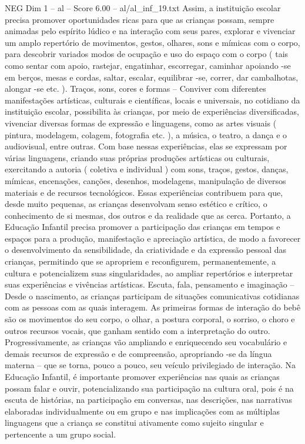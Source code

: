 \begin{textsample}{NEG Dim 1 – al – Score 6.00 – al/al\_inf\_19.txt}
Assim, a instituição escolar precisa promover oportunidades ricas para que as crianças possam, sempre animadas pelo espírito lúdico e na interação com seus pares, explorar e vivenciar um amplo repertório de movimentos, gestos, olhares, sons e mímicas com o corpo, para descobrir variados modos de ocupação e uso do espaço com o corpo ( tais como sentar com apoio, rastejar, engatinhar, escorregar, caminhar apoiando -se em berços, mesas e cordas, saltar, escalar, equilibrar -se, correr, dar cambalhotas, alongar -se etc. ).
Traços, sons, cores e formas – Conviver com diferentes manifestações artísticas, culturais e científicas, locais e universais, no cotidiano da instituição escolar, possibilita às crianças, por meio de experiências diversificadas, vivenciar diversas formas de expressão e linguagens, como as artes visuais ( pintura, modelagem, colagem, fotografia etc. ), a música, o teatro, a dança e o audiovisual, entre outras.
Com base nessas experiências, elas se expressam por várias linguagens, criando suas próprias produções artísticas ou culturais, exercitando a autoria ( coletiva e individual ) com sons, traços, gestos, danças, mímicas, encenações, canções, desenhos, modelagens, manipulação de diversos materiais e de recursos tecnológicos.
Essas experiências contribuem para que, desde muito pequenas, as crianças desenvolvam senso estético e crítico, o conhecimento de si mesmas, dos outros e da realidade que as cerca.
Portanto, a Educação Infantil precisa promover a participação das crianças em tempos e espaços para a produção, manifestação e apreciação artística, de modo a favorecer o desenvolvimento da sensibilidade, da criatividade e da expressão pessoal das crianças, permitindo que se apropriem e reconfigurem, permanentemente, a cultura e potencializem suas singularidades, ao ampliar repertórios e interpretar suas experiências e vivências artísticas.
Escuta, fala, pensamento e imaginação – Desde o nascimento, as crianças participam de situações comunicativas cotidianas com as pessoas com as quais interagem.
As primeiras formas de interação do bebê são os movimentos do seu corpo, o olhar, a postura corporal, o sorriso, o choro e outros recursos vocais, que ganham sentido com a interpretação do outro.
Progressivamente, as crianças vão ampliando e enriquecendo seu vocabulário e demais recursos de expressão e de compreensão, apropriando -se da língua materna – que se torna, pouco a pouco, seu veículo privilegiado de interação.
Na Educação Infantil, é importante promover experiências nas quais as crianças possam falar e ouvir, potencializando sua participação na cultura oral, pois é na escuta de histórias, na participação em conversas, nas descrições, nas narrativas elaboradas individualmente ou em grupo e nas implicações com as múltiplas linguagens que a criança se constitui ativamente como sujeito singular e pertencente a um grupo social.

\end{textsample}
